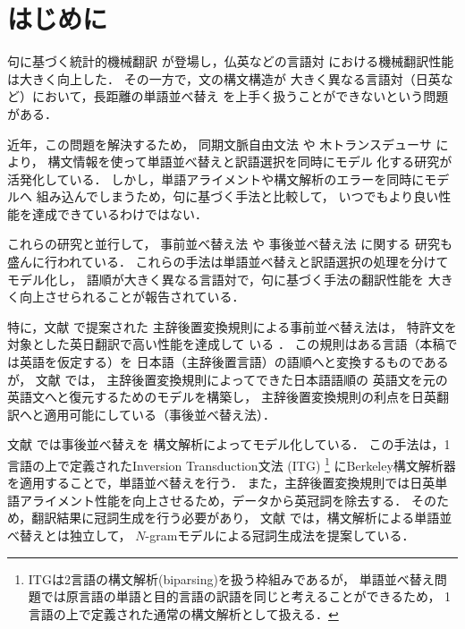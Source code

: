 \documentclass[japanese]{jnlp_1.4}
\begin{document}
\maketitle

\section{はじめに}
句に基づく統計的機械翻訳 \cite{Koehn:03}
が登場し，仏英などの言語対
における機械翻訳性能は大きく向上した．
その一方で，文の構文構造が
大きく異なる言語対（日英など）において，長距離の単語並べ替え
を上手く扱うことができないという問題がある．

近年，この問題を解決するため，
同期文脈自由文法 \cite{Wu:97,Chiang:05}や
木トランスデューサ \cite{Graehl:04,Galley:06}により，
構文情報を使って単語並べ替えと訳語選択を同時にモデル
化する研究が活発化している．
しかし，単語アライメントや構文解析のエラーを同時にモデルへ
組み込んでしまうため，句に基づく手法と比較して，
いつでもより良い性能を達成できているわけではない．

これらの研究と並行して，
事前並べ替え法 \cite{Collins:05,Isozaki:12}や
事後並べ替え法 \cite{Sudoh:11,Goto:12}に関する
研究も盛んに行われている．
これらの手法は単語並べ替えと訳語選択の処理を分けてモデル化し，
語順が大きく異なる言語対で，句に基づく手法の翻訳性能を
大きく向上させられることが報告されている．

特に，文献 \cite{Isozaki:12}で提案された
主辞後置変換規則による事前並べ替え法は，
特許文を対象とした英日翻訳で高い性能を達成して
いる \cite{Goto:09,Goto:10}．
この規則はある言語（本稿では英語を仮定する）を
日本語（主辞後置言語）の語順へと変換するものであるが，
文献 \cite{Sudoh:11}では，
主辞後置変換規則によってできた日本語語順の
英語文を元の英語文へと復元するためのモデルを構築し，
主辞後置変換規則の利点を日英翻訳へと適用可能にしている（事後並べ替え法）．

文献 \cite{Goto:12}では事後並べ替えを
構文解析によってモデル化している．
この手法は，1言語の上で定義されたInversion Transduction文法 (ITG) \cite{Wu:97}\footnote{
ITGは2言語の構文解析(biparsing)を扱う枠組みであるが，
単語並べ替え問題では原言語の単語と目的言語の訳語を同じと考えることができるため，
1言語の上で定義された通常の構文解析として扱える．}
にBerkeley構文解析器を適用することで，単語並べ替えを行う．
また，主辞後置変換規則では日英単語アライメント性能を向上させるため，データから英冠詞を除去する．
そのため，翻訳結果に冠詞生成を行う必要があり，
文献 \cite{Goto:12}では，構文解析による単語並べ替えとは独立して，
$N$-gramモデルによる冠詞生成法を提案している．
\end{document}
